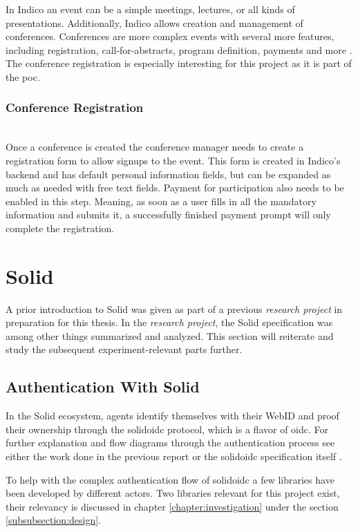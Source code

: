 In Indico an event can be a simple meetings, lectures, or all kinds of presentations. Additionally, Indico allows creation and management of conferences. Conferences are more complex events with several more features, including registration, call-for-abstracts, program definition, payments and more \cite{cern-indico-docs}. The conference registration is especially interesting for this project as it is part of the \gls{poc}.

\subsubsection{Conference Registration}\mbox{}\\

Once a conference is created the conference manager needs to create a registration form to allow signups to the event. This form is created in Indico's backend and has default personal information fields, but can be expanded as much as needed with free text fields. Payment for participation also needs to be enabled in this step. Meaning, as soon as a user fills in all the mandatory information and submits it, a successfully finished payment prompt will only complete the registration.

\section{Solid}

A prior introduction to Solid was given as part of a previous \textit{research project} \cite{cern-solid-investigation-spec} in preparation for this thesis. In the \textit{research project}, the Solid specification was among other things summarized and analyzed. This section will reiterate and study the subsequent experiment-relevant parts further.

\subsection{Authentication With Solid}

In the Solid ecosystem, agents identify themselves with their WebID and proof their ownership through the \gls{solidoidc} protocol, which is a flavor of \gls{oidc}. For further explanation and flow diagrams through the authentication process see either the work done in the previous report \cite{cern-solid-investigation-spec} or the \gls{solidoidc} specification itself \cite{solid-ecosystem-oidc}.

To help with the complex authentication flow of \gls{solidoidc} a few libraries have been developed by different actors. Two libraries relevant for this project exist, their relevancy is discussed in chapter \ref{chapter:investigation} under the section \ref{subsubsection:design}.

